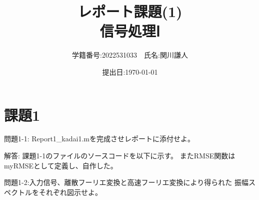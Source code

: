 \documentclass[a4paper,11pt]{ltjsarticle}
\begin{document}
\title{レポート課題(1) \\ 信号処理Ⅰ}

\author{学籍番号:2022531033　氏名:関川謙人}
\date{提出日:\today}
\maketitle

\section{課題1}
問題1-1:
Report1\_kadai1.mを完成させレポートに添付せよ。

解答:
課題1-1のファイルのソースコードを以下に示す。
またRMSE関数はmyRMSEとして定義し、自作した。


\newpage

問題1-2:入力信号、離散フーリエ変換と高速フーリエ変換により得られた
振幅スペクトルをそれぞれ図示せよ。
\end{document}
